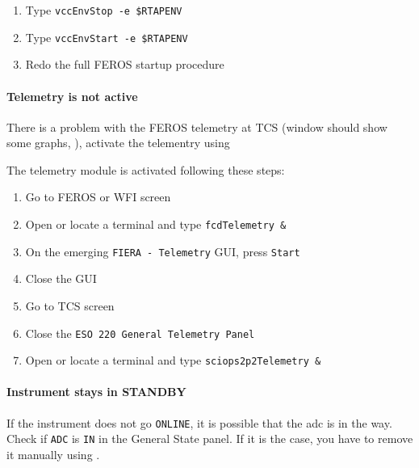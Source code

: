\documentclass[11pt,fleqn,a4paper]{book}
\begin{document}
\label{proc:restartenv}
\begin{enumerate}
\item Type \texttt{vccEnvStop -e \$RTAPENV}
\item Type \texttt{vccEnvStart -e \$RTAPENV}
\item Redo the full FEROS startup procedure
\end{enumerate}
 
\paragraph{Telemetry is not active}

There is a problem with the FEROS \gls{telemetry} at TCS (window should show some graphs, ), activate the telementry using 

The \gls{telemetry} module is activated following these steps:
\label{proc:telemetry}
\begin{enumerate}
    \item Go to FEROS or WFI screen
    \item Open or locate a terminal and type \texttt{\gls{fcdTelemetry} \&}
    \item On the emerging \texttt{FIERA - Telemetry} GUI, press \texttt{Start}
    \item Close the GUI
    \item Go to TCS screen
    \item Close the \texttt{ESO 220 General Telemetry Panel}
    \item Open or locate a terminal and type \texttt{sciops2p2Telemetry \&}
\end{enumerate}

\paragraph{Instrument stays in STANDBY}

If the instrument does not go \texttt{ONLINE}, it is possible that the \gls{adc} is in the way. Check if \texttt{ADC} is \texttt{IN} in the \gls{General State} 
panel. If it is the case, you have to remove it manually using .
\end{document}
